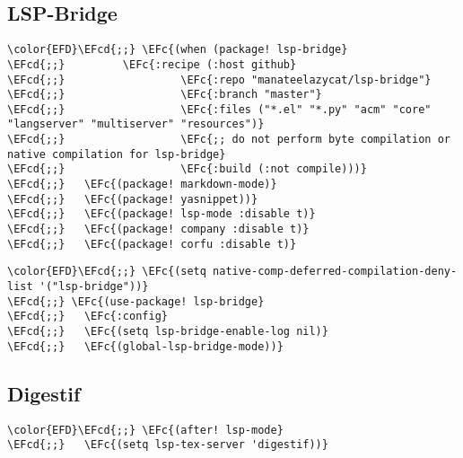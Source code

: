 \documentclass[12pt]{article}
\theoremstyle{plain}%
\theoremstyle{definition}
\theoremstyle{remark}
\newcommand{\EFc}[1]{\textcolor{EFc}{#1}} %
\newcommand{\EFcd}[1]{\textcolor{EFcd}{#1}} %
\begin{document}
\subsection{LSP-Bridge}
\label{sec:org1a0417e}
\begin{Code}
\begin{Verbatim}
\color{EFD}\EFcd{;;} \EFc{(when (package! lsp-bridge}
\EFcd{;;}         \EFc{:recipe (:host github}
\EFcd{;;}                  \EFc{:repo "manateelazycat/lsp-bridge"}
\EFcd{;;}                  \EFc{:branch "master"}
\EFcd{;;}                  \EFc{:files ("*.el" "*.py" "acm" "core" "langserver" "multiserver" "resources")}
\EFcd{;;}                  \EFc{;; do not perform byte compilation or native compilation for lsp-bridge}
\EFcd{;;}                  \EFc{:build (:not compile)))}
\EFcd{;;}   \EFc{(package! markdown-mode)}
\EFcd{;;}   \EFc{(package! yasnippet))}
\EFcd{;;}   \EFc{(package! lsp-mode :disable t)}
\EFcd{;;}   \EFc{(package! company :disable t)}
\EFcd{;;}   \EFc{(package! corfu :disable t)}
\end{Verbatim}
\end{Code}
\begin{Code}
\begin{Verbatim}
\color{EFD}\EFcd{;;} \EFc{(setq native-comp-deferred-compilation-deny-list '("lsp-bridge"))}
\EFcd{;;} \EFc{(use-package! lsp-bridge}
\EFcd{;;}   \EFc{:config}
\EFcd{;;}   \EFc{(setq lsp-bridge-enable-log nil)}
\EFcd{;;}   \EFc{(global-lsp-bridge-mode))}
\end{Verbatim}
\end{Code}
\subsection{Digestif}
\label{sec:org6fc1430}
\begin{Code}
\begin{Verbatim}
\color{EFD}\EFcd{;;} \EFc{(after! lsp-mode}
\EFcd{;;}   \EFc{(setq lsp-tex-server 'digestif))}
\end{Verbatim}
\end{Code}
\end{document}
